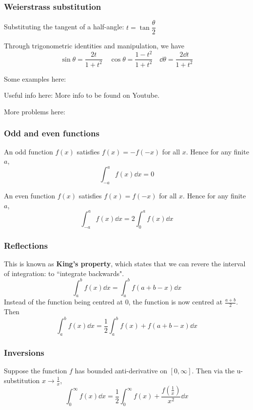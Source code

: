 \subsubsection{Weierstrass substitution}
Substituting the tangent of a half-angle: $t=\tan\dfrac{\theta}{2}$

Through trigonometric identities and manipulation, we have
\[ \sin\theta = \frac{2t}{1+t^2} \quad \cos\theta = \frac{1-t^2}{1+t^2} \quad \dd{\theta} = \frac{2\dd{t}}{1+t^2} \]

Some examples here: %

Useful info here:
More info to be found on Youtube.

More problems here: %
\pagebreak

\subsubsection{Odd and even functions}
An odd function $f(x)$ satisfies $f(x)=-f(-x)$ for all $x$. Hence for any finite $a$,
\[ \int_{-a}^a f(x) \dd{x} = 0 \]

An even function $f(x)$ satisfies $f(x)=f(-x)$ for all $x$. Hence for any finite $a$,
\[ \int_{-a}^a f(x) \dd{x} = 2\int_0^a f(x) \dd{x} \]

\subsubsection{Reflections}
This is known as \textbf{King's property}, which states that we can revere the interval of integration: to ``integrate backwards".
\begin{equation}
\int_a^b f(x) \dd{x} = \int_a^b f(a+b-x) \dd{x}
\end{equation}
Instead of the function being centred at 0, the function is now centred at $\frac{a+b}{2}$. Then
\[ \int_a^b f(x) \dd{x} = \frac{1}{2} \int_a^b f(x) + f(a+b-x) \dd{x} \]

\subsubsection{Inversions}
Suppose the function $f$ has bounded anti-derivative on $[0,\infty]$. Then via the u-substitution $x\to\frac{1}{x}$,
\[ \int_0^\infty f(x) \dd{x} = \frac{1}{2}\int_0^\infty f(x) + \frac{f(\frac{1}{x})}{x^2} \dd{x} \]

